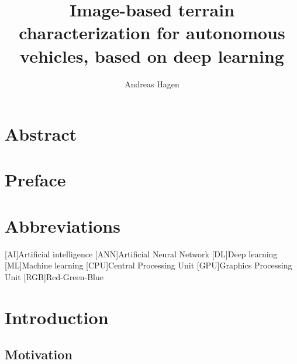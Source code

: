\documentclass[USenglish]{ifimaster}  %
\title{Image-based terrain characterization for autonomous vehicles, based on deep learning}        %
\author{Andreas Hagen}                      %
\begin{document}
\duoforside[dept={Department of Technology Systems},   %
  program={Cybernetics},  %
  short]                                        %

\frontmatter{}
\chapter*{Abstract}                   %

\tableofcontents{}
\listoffigures{}
\listoftables{}

\chapter*{Preface}
\chapter*{Abbreviations}
\begin{acronym}
        [AI]{Artificial intelligence}
        [ANN]{Artificial Neural Network}
        [DL]{Deep learning}
        [ML]{Machine learning}
        [CPU]{Central Processing Unit}
        [GPU]{Graphics Processing Unit}
        [RGB]{Red-Green-Blue}
\end{acronym}


\mainmatter{}
\chapter{Introduction}                  
\section{Motivation}
\end{document}
